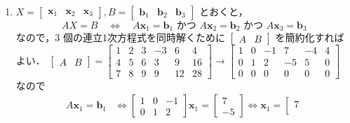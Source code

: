 \documentclass[11pt, uplatex, dvipdfmx]{jsarticle}
\begin{document}
\begin{enumerate}
\begin{enumerate}[(1)]
  \item $X=\left[
      \begin{array}{ccc}
        \bm{x}_1 & \bm{x}_2 & \bm{x}_3
      \end{array}
    \right], B=\left[
      \begin{array}{ccc}
        \bm{b}_1 & \bm{b}_2 & \bm{b}_3
      \end{array}
    \right]$ とおくと，
    \[
      AX=B \quad \Longleftrightarrow \quad A\bm{x}_1 = \bm{b}_1
      \text{ かつ } A\bm{x}_2 = \bm{b}_2 \text{ かつ }
      A\bm{x}_3=\bm{b}_3
    \]
    なので，$3$ 個の連立1次方程式を同時解くために $\left[
      \begin{array}{cc}
        A & B
      \end{array}
    \right]$ を簡約化すればよい．
    $\left[
      \begin{array}{cc}
        A & B
      \end{array}
    \right] = \left[
      \begin{array}{rrrrrr}
        1 & 2 & 3 & -3 & 6 & 4\\
        4 & 5 & 6 & 3 & 9 & 16\\
        7 & 8 & 9 & 9 & 12 & 28
      \end{array}
    \right] \to  \left[
      \begin{array}{rrrrrr}
        1 & 0 & -1 & 7 & -4 & 4\\
        0 & 1 & 2 & -5 & 5 & 0\\
        0 & 0 & 0 & 0 & 0 & 0
      \end{array}
    \right]$ なので
    \[
      \begin{aligned}
        A\bm{x}_1 = \bm{b}_1 & \Leftrightarrow \left[
                               \begin{array}{rrr}
                                 1 & 0 & -1\\
                                 0 & 1 & 2
                               \end{array}
                               \right] \bm{x}_1 = \left[
                               \begin{array}{r}
                                 7\\
                                 -5
                               \end{array}
                               \right] \Leftrightarrow \bm{x}_1 = \left[
                               \begin{array}{r}
                                 7\\

\end{array}
\end{aligned}\]
\end{enumerate}
\end{enumerate}
\end{document}
